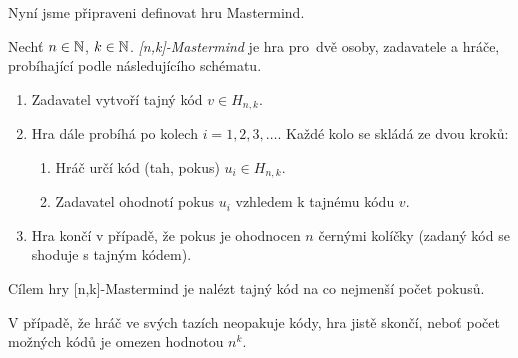 

Nyní jsme připraveni definovat hru Mastermind. 

\begin{definice}[{[n,k]-Mastermind}]
    Nechť $n \in \mathbb{N} $, $k \in \mathbb{N}$. \emph{[n,k]-Mastermind} je hra pro~dvě osoby, zadavatele a hráče, 
    probíhající podle následujícího schématu. 
    \begin{enumerate}
        \item Zadavatel vytvoří tajný kód $v \in H_{n,k}$.
        \item Hra dále probíhá po kolech $i = 1,2,3,\dots$. Každé kolo se skládá ze dvou kroků:
            \begin{enumerate}
                \item Hráč určí kód (tah, pokus) $u_i \in H_{n,k}$.
                \item Zadavatel ohodnotí pokus $u_i$ vzhledem k tajnému kódu $v$. 
            \end{enumerate}
        \item Hra končí v případě, že pokus je ohodnocen $n$ černými kolíčky (zadaný kód se shoduje s tajným kódem). 
    \end{enumerate}
    Cílem hry [n,k]-Mastermind je nalézt tajný kód na co nejmenší počet pokusů.
\end{definice}
\begin{pozn}
     V případě, že hráč ve svých tazích neopakuje kódy, hra jistě skončí, neboť počet možných kódů je omezen hodnotou $n^k$.
\end{pozn}





